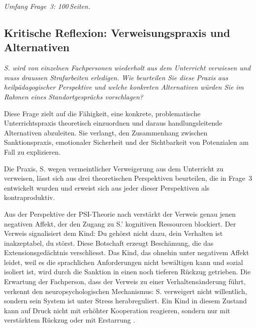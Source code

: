 \documentclass[ngerman, a4paper]{article}
\begin{document}
\textit{Umfang Frage~3: 100\,Seiten.}
 

 


\subsection{Kritische Reflexion: Verweisungspraxis und Alternativen}


\begin{tcolorbox}[colback=gray!5, colframe=gray!50, title=Weiterführende Diskurslinie]
\itshape
S. wird von einzelnen Fachpersonen wiederholt aus dem Unterricht verwiesen und
muss draussen Strafarbeiten erledigen. Wie beurteilen Sie diese Praxis aus
heilpädagogischer Perspektive und welche konkreten Alternativen würden Sie
im Rahmen eines Standortgesprächs vorschlagen?
\end{tcolorbox}

Diese Frage zielt auf die Fähigkeit, eine konkrete, problematische Unterrichtspraxis
theoretisch einzuordnen und daraus handlungsleitende Alternativen abzuleiten. Sie
verlangt, den Zusammenhang zwischen Sanktionspraxis, emotionaler Sicherheit und
der Sichtbarkeit von Potenzialen am Fall zu explizieren.

Die Praxis, S. wegen vermeintlicher Verweigerung aus dem Unterricht zu verweisen,
lässt sich aus drei theoretischen Perspektiven beurteilen, die in Frage~3 entwickelt
wurden und erweist sich aus jeder dieser Perspektiven als kontraproduktiv.

Aus der Perspektive der PSI-Theorie nach \textcite[S.\,35--57]{kuhl2019diversitaet} verstärkt der Verweis
genau jenen negativen Affekt, der den Zugang zu S.' kognitiven Ressourcen blockiert.
Der Verweis signalisiert dem Kind: Du gehörst nicht dazu, dein Verhalten ist
inakzeptabel, du störst. Diese Botschaft erzeugt Beschämung, die das
Extensionsgedächtnis verschliesst. Das Kind, das ohnehin unter negativem Affekt
leidet, weil es die sprachlichen Anforderungen nicht bewältigen kann und sozial
isoliert ist, wird durch die Sanktion in einen noch tieferen Rückzug getrieben.
Die Erwartung der Fachperson, dass der Verweis zu einer Verhaltensänderung führt,
verkennt den neuropsychologischen Mechanismus: S. verweigert nicht willentlich,
sondern sein System ist unter Stress herabreguliert. Ein Kind in diesem Zustand
kann auf Druck nicht mit erhöhter Kooperation reagieren, sondern nur mit
verstärktem Rückzug oder mit Erstarrung \parencite[S.\,35--57]{kuhl2019diversitaet}.
\end{document}
